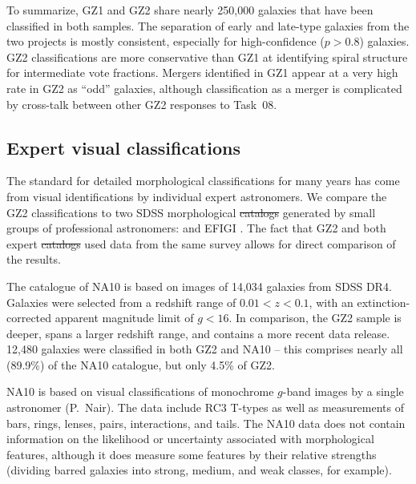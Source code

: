 \documentclass[useAMS,usenatbib]{mn2e}
\providecommand{\DIFaddtex}[1]{{\protect\color{blue}\uwave{#1}}} %
\providecommand{\DIFdeltex}[1]{{\protect\color{red}\sout{#1}}}                      %
\providecommand{\DIFaddbegin}{} %
\providecommand{\DIFaddend}{} %
\providecommand{\DIFdelbegin}{} %
\providecommand{\DIFdelend}{} %
\providecommand{\DIFadd}[1]{\texorpdfstring{\DIFaddtex{#1}}{#1}} %
\providecommand{\DIFdel}[1]{\texorpdfstring{\DIFdeltex{#1}}{}} %
\begin{document}

To summarize, GZ1 and GZ2 share nearly 250,000 galaxies that have been classified in both samples. The separation of early and late-type galaxies from the two projects is mostly consistent, especially for high-confidence ($p>0.8$) galaxies. GZ2 classifications are more conservative than GZ1 at identifying spiral structure for intermediate vote fractions. Mergers identified in GZ1 appear at a very high rate in GZ2 as ``odd'' galaxies, although classification as a merger is complicated by cross-talk between other GZ2 responses to Task~08. 

\subsection{Expert visual classifications}

The standard for detailed morphological classifications for many years has come from visual identifications by individual expert astronomers. We compare the GZ2 classifications to two SDSS morphological \DIFdelbegin \DIFdel{catalogs }\DIFdelend \DIFaddbegin \DIFadd{catalogues }\DIFaddend generated by small groups of professional astronomers: \citet[][hereafter NA10]{nai10} and EFIGI \citep{bai11}. The fact that GZ2 and both expert \DIFdelbegin \DIFdel{catalogs }\DIFdelend \DIFaddbegin \DIFadd{catalogues }\DIFaddend used data from the same survey allows for direct comparison of the results.

The catalogue of NA10 is based on images of 14,034 galaxies from SDSS DR4. Galaxies were selected from a redshift range of $0.01<z<0.1$, with an extinction-corrected apparent magnitude limit of $g<16$. In comparison, the GZ2 sample is deeper, spans a larger redshift range, and contains a more recent data release. 12,480 galaxies were classified in both GZ2 and NA10 -- this comprises nearly all (89.9\%) of the NA10 catalogue, but only 4.5\% of GZ2. 

NA10 is based on visual classifications of monochrome $g$-band images by a single astronomer (P.~Nair). The data include RC3 T-types \citep[a numerical index of a galaxy's stage along the Hubble sequence;][]{dev91} as well as measurements of bars, rings, lenses, pairs, interactions, and tails. The NA10 data does not contain information on the likelihood or uncertainty associated with morphological features, although it does measure some features by their relative strengths (dividing barred galaxies into strong, medium, and weak classes, for example). 
\end{document}
